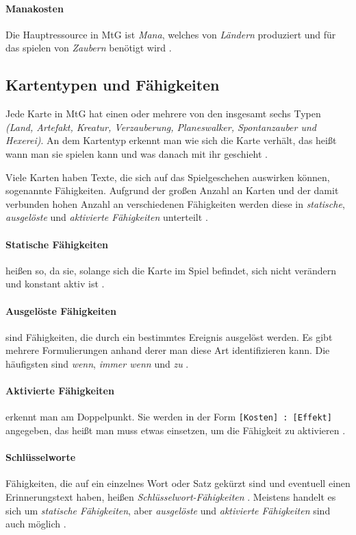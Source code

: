 \paragraph{Manakosten}
Die Hauptressource in \ac{MtG} ist \emph{Mana}, welches von \emph{Ländern} produziert und für das spielen von \emph{Zaubern} benötigt wird \cite{rulebook:2013}. 

\subsection{Kartentypen und Fähigkeiten}
Jede Karte in \ac{MtG} hat einen oder mehrere von den insgesamt sechs Typen \emph{(Land, Artefakt, Kreatur, Verzauberung, Planeswalker, Spontanzauber und Hexerei)}. An dem Kartentyp erkennt man wie sich die Karte verhält, das heißt wann man sie spielen kann und was danach mit ihr geschieht \cite{rulebook:2013}.

Viele Karten haben Texte, die sich auf das Spielgeschehen auswirken können, sogenannte Fähigkeiten. Aufgrund der großen Anzahl an Karten und der damit verbunden hohen Anzahl an verschiedenen Fähigkeiten werden diese in \emph{statische}, \emph{ausgelöste} und \emph{aktivierte Fähigkeiten} unterteilt \cite{rulebook:2013}.

\paragraph{Statische Fähigkeiten}
heißen so, da sie, solange sich die Karte im Spiel befindet, sich nicht verändern und konstant aktiv ist \cite{rulebook:2013}.

\paragraph{Ausgelöste Fähigkeiten}
sind Fähigkeiten, die durch ein bestimmtes Ereignis ausgelöst werden. Es gibt mehrere Formulierungen anhand derer man diese Art identifizieren kann. Die häufigsten sind \emph{wenn}, \emph{immer wenn} und \emph{zu} \cite{rulebook:2013}.

\paragraph{Aktivierte Fähigkeiten}
 erkennt man am Doppelpunkt. Sie werden in der Form \verb|[Kosten] : [Effekt]| angegeben, das heißt man muss etwas einsetzen, um die Fähigkeit zu aktivieren \cite{rulebook:2013}.

\paragraph{Schlüsselworte}
Fähigkeiten, die auf ein einzelnes Wort oder Satz gekürzt sind und eventuell einen Erinnerungstext haben, heißen \emph{Schlüsselwort-Fähigkeiten} \cite{rulebook:2013}. Meistens handelt es sich um \emph{statische Fähigkeiten}, aber \emph{ausgelöste} und \emph{aktivierte Fähigkeiten} sind auch möglich \cite{rulebook:2013}.


